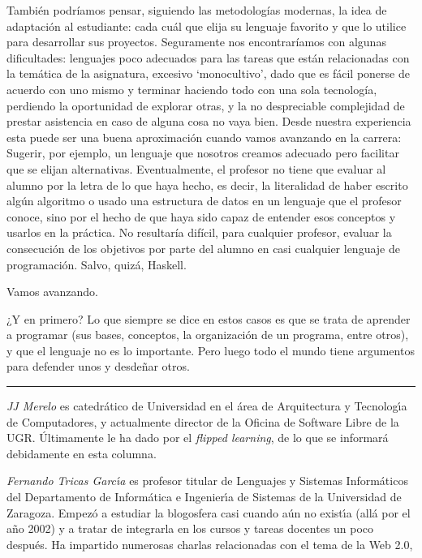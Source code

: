 \documentclass[twoside,10pt]{article}
\newcounter{num}
\begin{document}
\begin{multicols}{2}
También podríamos pensar, siguiendo las metodologías modernas, la idea de
adaptación al estudiante: cada cuál que elija su lenguaje favorito y que lo utilice
para desarrollar sus proyectos. Seguramente nos encontraríamos con algunas
dificultades: lenguajes poco adecuados para las tareas que están
relacionadas con la temática de la asignatura, excesivo `monocultivo',
dado que es fácil ponerse de acuerdo con uno mismo y terminar haciendo todo con una
sola tecnología, perdiendo la oportunidad de explorar otras, y la no
despreciable complejidad de prestar asistencia en caso de alguna cosa no
vaya bien. Desde nuestra experiencia esta puede ser una buena aproximación cuando
vamos avanzando en la carrera: Sugerir, por ejemplo, un lenguaje que
nosotros creamos adecuado pero facilitar que se elijan
alternativas. Eventualmente, el profesor no tiene que evaluar al
alumno por la letra de lo que haya hecho, es decir, la literalidad de
haber escrito algún algoritmo o usado una estructura de datos en un
lenguaje que el profesor conoce, sino por el hecho de que haya sido
capaz de entender esos conceptos y usarlos en la práctica. No
resultaría difícil, para cualquier profesor, evaluar la consecución de
los objetivos por parte del alumno en casi cualquier lenguaje de
programación. Salvo, quizá, Haskell. 

Vamos avanzando.

¿Y en primero? 
Lo que siempre se dice en estos casos es que se trata de aprender a
programar (sus bases, conceptos, la organización de un programa, entre
otros), y que el lenguaje no es lo
importante. Pero luego todo el mundo tiene argumentos para defender unos
y desdeñar otros.
\noindent\rule{86mm}{1pt}
\vspace{1ex} {\small{\begin{window} 
\noindent\emph{JJ Merelo} es catedr\'{a}tico de Universidad
en el \'area de Arquitectura y Tecnolog\'{\i}a de Computadores, y
actualmente director de la Oficina de Software Libre de la UGR.
\'{U}ltimamente le ha dado por el \textsl{flipped
learning}, de lo que se informar\'{a} debidamente en esta columna.
\end{window}}}

\medskip

{\small{\begin{window}
		\noindent \emph{Fernando Tricas Garc\'{\i}a} es profesor
		titular de Lenguajes y Sistemas Inform\'{a}ticos del Departamento
		de Inform\'{a}tica e Ingenier\'{\i}a de Sistemas de la Universidad de
		Zaragoza.  Empez\'{o} a estudiar la blogosfera casi cuando a\'{u}n no
		exist\'{\i}a (all\'{a} por el a\~{n}o 2002) y a tratar de integrarla en los
		cursos y tareas docentes un poco despu\'{e}s.  Ha impartido
		numerosas charlas relacionadas con el tema de la Web 2.0, 


\end{window}}}
\end{multicols}
\end{document}
